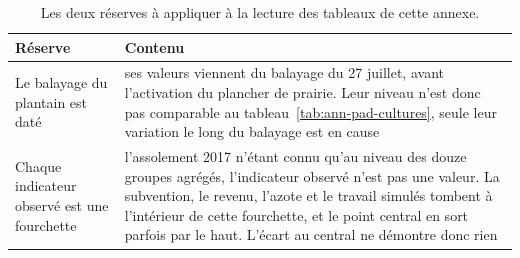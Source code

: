 \begin{table}[H]
  \centering
  \caption{Les deux réserves à appliquer à la lecture des tableaux de cette annexe.}
  \label{tab:ann-reserves-calib}
  \scriptsize
  \setlength{\tabcolsep}{4pt}
  \begin{tabularx}{\textwidth}{@{}p{34mm}X@{}}
    \toprule
    \textbf{Réserve} & \textbf{Contenu} \\
    \midrule
    Le balayage du plantain est daté & ses valeurs viennent du balayage du 27 juillet, avant
      l'activation du plancher de prairie. Leur niveau n'est donc pas comparable au
      tableau~\ref{tab:ann-pad-cultures}, seule leur variation le long du balayage est en
      cause \\
    Chaque indicateur observé est une fourchette & l'assolement 2017 n'étant connu qu'au niveau
      des douze groupes agrégés, l'indicateur observé n'est pas une valeur. La subvention, le
      revenu, l'azote et le travail simulés tombent à l'intérieur de cette fourchette, et le
      point central en sort parfois par le haut. L'écart au central ne démontre donc rien \\
    \bottomrule
  \end{tabularx}
\end{table}
